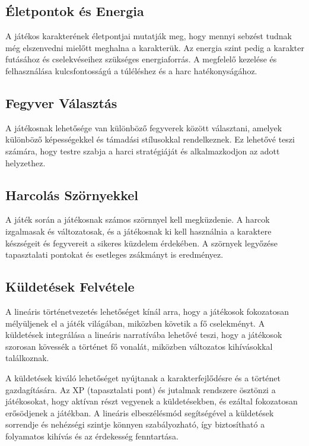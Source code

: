 \subsection{Életpontok és Energia}

A játékos karakterének életpontjai mutatják meg, hogy mennyi sebzést tudnak még elszenvedni mielőtt meghalna a karakterük. Az energia szint pedig a karakter futásához és cselekvéseihez szükséges energiaforrás. A megfelelő kezelése és felhasználása kulcsfontosságú a túléléshez és a harc hatékonyságához.

\subsection{Fegyver Választás}

A játékosnak lehetősége van különböző fegyverek között választani, amelyek különböző képességekkel és támadási stílusokkal rendelkeznek. Ez lehetővé teszi számára, hogy testre szabja a harci stratégiáját és alkalmazkodjon az adott helyzethez.

\subsection{Harcolás Szörnyekkel}

A játék során a játékosnak számos szörnnyel kell megküzdenie. A harcok izgalmasak és változatosak, és a játékosnak ki kell használnia a karaktere készségeit és fegyvereit a sikeres küzdelem érdekében. A szörnyek legyőzése tapasztalati pontokat és esetleges zsákmányt is eredményez.

\subsection{Küldetések Felvétele}

A lineáris történetvezetés lehetőséget kínál arra, hogy a játékosok fokozatosan mélyüljenek el a játék világában, miközben követik a fő cselekményt. A küldetések integrálása a lineáris narratívába lehetővé teszi, hogy a játékosok szorosan kövessék a történet fő vonalát, miközben változatos kihívásokkal találkoznak.

A küldetések kiváló lehetőséget nyújtanak a karakterfejlődésre és a történet gazdagítására. Az XP (tapasztalati pont) és jutalmak rendszere ösztönzi a játékosokat, hogy aktívan részt vegyenek a küldetésekben, és ezáltal fokozatosan erősödjenek a játékban. A lineáris elbeszélésmód segítségével a küldetések sorrendje és nehézségi szintje könnyen szabályozható, így biztosítható a folyamatos kihívás és az érdekesség fenntartása.

